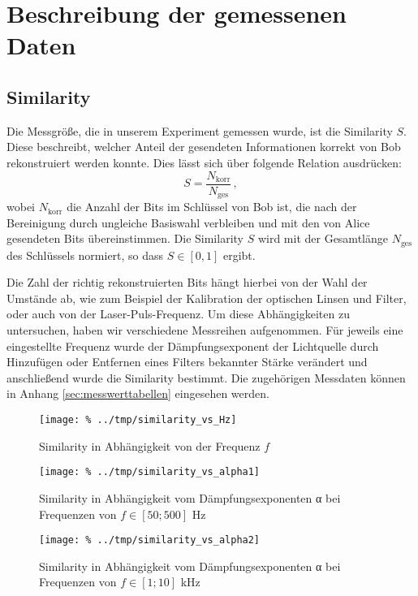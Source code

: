\section{Beschreibung der gemessenen Daten}
\subsection{Similarity}
Die Messgröße, die in unserem Experiment gemessen wurde, ist die Similarity $S$.
Diese beschreibt, welcher Anteil der gesendeten Informationen korrekt von Bob
rekonstruiert werden konnte. Dies lässt sich über folgende Relation ausdrücken:
\begin{equation}
S = \frac{N_{\mathrm{korr}}}{N_{\mathrm{ges}}}\,,
\end{equation}
wobei $N_{\mathrm{korr}}$ die Anzahl der Bits im Schlüssel von Bob ist,
die nach der Bereinigung durch ungleiche Basiswahl verbleiben und mit den von
Alice gesendeten Bits übereinstimmen. Die Similarity $S$ wird mit der Gesamtlänge
$N_{\mathrm{ges}}$ des Schlüssels normiert, so dass $S \in [0,1]$ ergibt.

Die Zahl der richtig rekonstruierten Bits hängt hierbei von der Wahl der
Umstände ab, wie zum Beispiel der Kalibration der optischen Linsen und Filter, oder
auch von der Laser-Puls-Frequenz. Um diese Abhängigkeiten zu untersuchen, haben
wir verschiedene Messreihen aufgenommen. Für jeweils eine eingestellte Frequenz
wurde der Dämpfungsexponent der Lichtquelle durch Hinzufügen oder Entfernen eines Filters
bekannter Stärke verändert und anschließend wurde die Similarity bestimmt. Die
zugehörigen Messdaten können in Anhang \ref{sec:messwerttabellen} eingesehen
werden.


\begin{figure}[htb]
 \centering
 \texttt{[image: \%
  ../tmp/similarity\_vs\_Hz]}
 \caption{Similarity in Abhängigkeit von der Frequenz $f$}
 \label{fig:sim_frequenz}
\end{figure}

\begin{figure}[htb]
 \centering
 \texttt{[image: \%
  ../tmp/similarity\_vs\_alpha1]}
 \caption{Similarity in Abhängigkeit vom Dämpfungsexponenten α bei Frequenzen%
 von $f\in [50;500]$ Hz}
 \label{fig:sim_alpha1}
\end{figure}

\begin{figure}[htb]
 \centering
 \texttt{[image: \%
  ../tmp/similarity\_vs\_alpha2]}
 \caption{Similarity in Abhängigkeit vom Dämpfungsexponenten α bei Frequenzen%
 von $f\in [1;10]$ kHz}
 \label{fig:sim_alpha2}
\end{figure}

